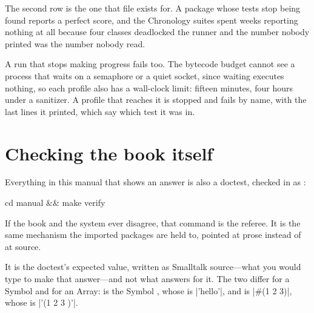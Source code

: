The second row is the one that file exists for. A package whose tests stop
being found reports a perfect score, and the Chronology suites spent weeks
reporting nothing at all because four classes deadlocked the runner and the
number nobody printed was the number nobody read.

A run that stops making progress fails too. The bytecode budget cannot see a
process that waits on a semaphore or a quiet socket, since waiting executes
nothing, so each profile also has a wall-clock limit: fifteen minutes, four
hours under a sanitizer. A profile that reaches it is stopped and fails by
name, with the last lines it printed, which say which test it was in.

\section{Checking the book itself}

Everything in this manual that shows an answer is also a doctest, checked in
as :

\begin{sh}
cd manual && make verify
\end{sh}

If the book and the system ever disagree, that command is the referee. It is
the same mechanism the imported packages are held to, pointed at prose instead
of at source.

\begin{stnote}
It is the doctest's expected value, written as Smalltalk source---what you
would type to make that answer---and not what  answers for
it. The two differ for a Symbol and for an Array:  is
the Symbol , whose  is \ct|'hello'|, and
 is \ct|#(1 2 3)|, whose  is
\ct|'(1 2 3 )'|.
\end{stnote}
